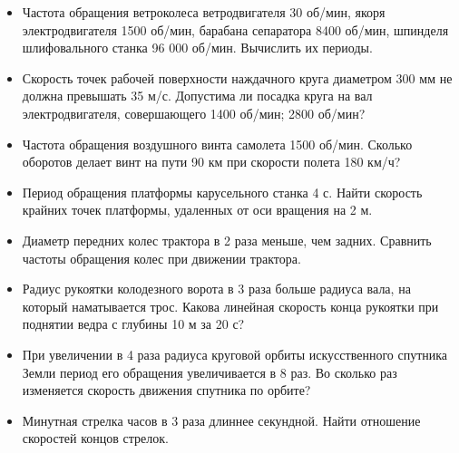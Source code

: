 \begin{itemize}
	\renewcommand{\labelitemi}{\stepcounter{tasks}\Roman{tasks}.}
	\item Частота обращения ветроколеса ветродвигателя 30 об/мин, якоря электродвигателя 1500 об/мин, барабана сепаратора 8400 об/мин, шпинделя шлифовального станка 96 000 об/мин. Вычислить их периоды.
	\item Скорость точек рабочей поверхности наждачного круга диаметром 300 мм не должна превышать 35 м/с. Допустима ли посадка круга на вал электродвигателя, совершающего 1400 об/мин; 2800 об/мин?
	\item Частота обращения воздушного винта самолета 1500 об/мин. Сколько оборотов делает винт на пути 90 км при скорости полета 180 км/ч?
	\item Период обращения платформы карусельного станка 4 с. Найти скорость крайних точек платформы, удаленных от оси вращения на 2 м.
	\item Диаметр передних колес трактора в 2 раза меньше, чем задних. Сравнить частоты обращения колес при движении трактора.
	\item Радиус рукоятки колодезного ворота в 3 раза больше радиуса вала, на который наматывается трос. Какова линейная скорость конца рукоятки при поднятии ведра с глубины 10 м за 20 с?
	\item При увеличении в 4 раза радиуса круговой орбиты искусственного спутника Земли период его обращения увеличивается в 8 раз. Во сколько раз изменяется скорость движения спутника по орбите?	
	\item Минутная стрелка часов в 3 раза длиннее секундной. Найти отношение скоростей концов стрелок.\\
\end{itemize}